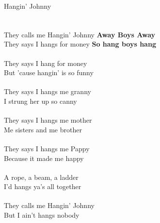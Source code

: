 \documentclass[letterpaper,9pt]{article}
\begin{document}
\newpage
{}
\huge
Hangin' Johnny\\
\\
\huge
\noindent
\\They calls me Hangin' Johnny \textbf{Away Boys Away}
\\They says I hangs for money \textbf{So hang boys hang}
\\
\\They says I hang for money
\\But 'cause hangin' is so funny
\\
\\They says I hangs me granny
\\I strung her up so canny
\\
\\They says I hangs me mother
\\Me sisters and me brother
\\
\\They says I hangs me Pappy
\\Because it made me happy
\\
\\A rope, a beam, a ladder
\\I'd hangs ya's all together
\\
\\They calls me Hangin' Johnny
\\But I ain't hangs nobody
\end{document}
